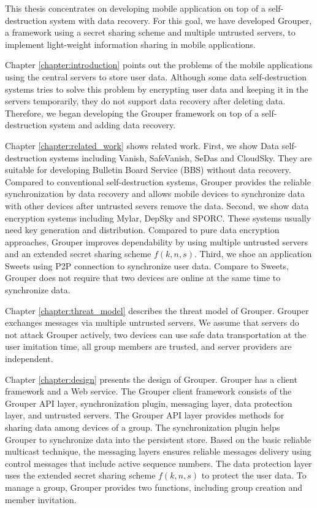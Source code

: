\documentclass[a4paper,11pt]{report}
\begin{document}
This thesis concentrates on developing mobile application on top of a self-destruction system with data recovery.
For this goal, we have developed Grouper, a framework using a secret sharing scheme and multiple untrusted servers, to implement light-weight information sharing in mobile applications.

Chapter \ref{chapter:introduction} points out the problems of the mobile applications using the central servers to store user data.
Although some data self-destruction systems tries to solve this problem by encrypting user data and keeping it in the servers temporarily, they do not support data recovery after deleting data.
Therefore, we began developing the Grouper framework on top of a self-destruction system and adding data recovery.

Chapter \ref{chapter:related_work} shows related work.
First, we show Data self-destruction systems including Vanish, SafeVanish, SeDas and CloudSky.
They are suitable for developing Bulletin Board Service (BBS) without data recovery.
Compared to conventional self-destruction systems, Grouper provides the reliable synchronization by data recovery and allows mobile devices to synchronize data with other devices after untrusted severs remove the data.
Second, we show data encryption systems including Mylar, DepSky and SPORC.
These systems usually need key generation and distribution.
Compared to pure data encryption approaches, Grouper improves dependability by using multiple untrusted servers and an extended secret sharing scheme $f(k, n, s)$.
Third, we shoe an application Sweets using P2P connection to synchronize user data.
Compare to Sweets, Grouper does not require that two devices are online at the same time to synchronize data.

Chapter \ref{chapter:threat_model} describes the threat model of Grouper.
Grouper exchanges messages via multiple untrusted servers.
We assume that servers do not attack Grouper actively, two devices can use safe data transportation at the user imitation time, all group members are trusted, and server providers are independent.  

Chapter \ref{chapter:design} presents the design of Grouper.
Grouper has a client framework and a Web service.
The Grouper client framework consists of the Grouper API layer, synchronization plugin, messaging layer, data protection layer, and untrusted servers.
The Grouper API layer provides methods for sharing data among devices of a group.
The synchronization plugin helps Grouper to synchronize data into the persistent store.
Based on the basic reliable multicast technique, the messaging layers ensures reliable messages delivery using control messages that include active sequence numbers.
The data protection layer uses the extended secret sharing scheme $f(k ,n, s)$ to protect the user data.
To manage a group, Grouper provides two functions, including group creation and member invitation.
\end{document}
